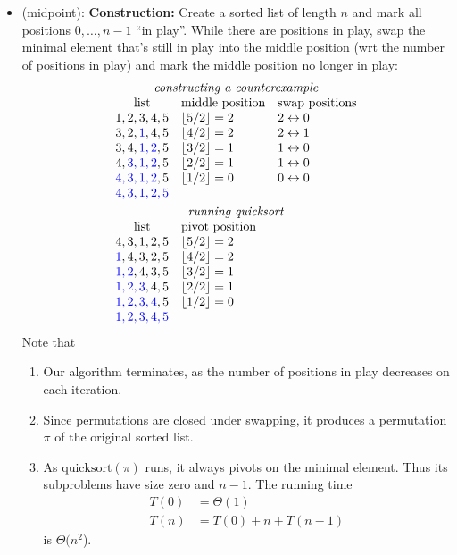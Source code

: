 \documentclass[a4paper]{article}
\newcommand*{\floor}[1]{\left\lfloor{#1}\right\rfloor}
\begin{document}
\begin{itemize}

	\item
	(midpoint):
	\textbf{Construction:}
	Create a sorted list of length $n$ and mark all positions $0,\ldots,n-1$ ``in play''.
	While there are positions in play, swap the minimal element that's still in play into the middle position (wrt the number of positions in play) and mark the middle position no longer in play:
	\[
		\begin{array}{cll}
		\multicolumn{3}{c}{\text{\emph{constructing a counterexample}}} \\
		\text{list} & \text{middle position} & \text{swap positions} \\
		1, 2, 3, 4, 5	&\floor{5/2} = 2 & 2 \SWAP 0\\
		3, 2, \USED{1}, 4, 5	&\floor{4/2} = 2 & 2 \SWAP 1 \\
		3, 4, \USED{1, 2}, 5	&\floor{3/2} = 1 & 1 \SWAP 0 \\
		4, \USED{3, 1, 2}, 5	&\floor{2/2} = 1 & 1 \SWAP 0 \\
		\USED{4, 3, 1, 2}, 5	&\floor{1/2} = 0 & 0 \SWAP 0 \\
		\USED{4, 3, 1, 2, 5} \\[\jot]
		\multicolumn{3}{c}{\text{\emph{running quicksort}}} \\
		\text{list} & \text{pivot position} \\
		4, 3, 1, 2, 5	& \floor{5/2} = 2 \\
		\USED{1}, 4, 3, 2, 5	&\floor{4/2} = 2 \\
		\USED{1, 2}, 4, 3, 5	&\floor{3/2} = 1 \\
		\USED{1, 2, 3}, 4, 5	&\floor{2/2} = 1 \\
		\USED{1, 2, 3, 4}, 5	&\floor{1/2} = 0 \\
		\USED{1, 2, 3, 4, 5}
		\end{array}
	\]
	Note that
	\begin{enumerate}
	\item Our algorithm terminates, as the number of positions in play decreases on each iteration.
	\item Since permutations are closed under swapping, it produces a permutation $\pi$ of the original sorted list.
	\item As $\text{quicksort}(\pi)$ runs, it always pivots on the minimal element.
	Thus its subproblems have size zero and $n-1$.
	The running time
	\begin{align*}
		T(0) &= \Theta(1) \\
		T(n) &= T(0) + n + T(n-1)
	\end{align*}
	is $\Theta(n^2$).


\end{enumerate}
\end{itemize}
\end{document}
